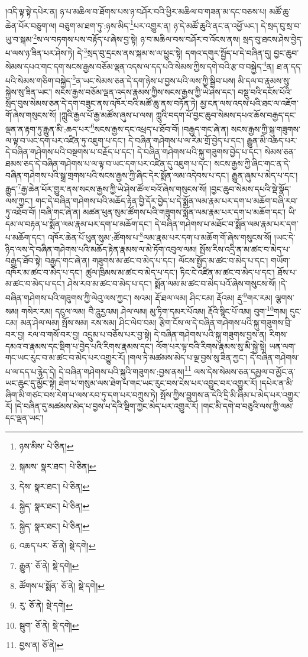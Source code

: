 །འདི་ལྟ་སྟེ་དཔེར་ན། ཉ་པ་མཆིལ་བ་ཐོགས་པས་ཉ་བཤོར་བའི་ཕྱིར་མཆིལ་བ་གཟན་མ་དང་བཅས་པ། མཚོ་ཆུ་ཆེན་པོར་བཅུག་ལ། བཅུག་མ་ཐག་ཏུ་:ཉས་མིད་\footnote{ཉས་མིས་  པེ་ཅིན། }པར་འགྱུར་ན། ཉ་དེ་མཚོ་ཆུའི་ནང་ན་འཕྱོ་ཡང་། དེ་སྲད་བུ་སྲ་བ་ཡུ་བ་སྐམ་\footnote{སྐམས་  སྣར་ཐང་།  པེ་ཅིན། }ས་ལ་བཏགས་པས་བརྟོད་པ་ཞེས་བྱ་སྟེ། ཉ་བ་མཆིལ་བས་བཤོར་བ་འོངས་ནས། སྲད་བུ་ཐངས་ཤེས་བྱེད་པ་ལས་ཉ་ཟིན་པར་ཤེས་ཏེ། དེ་\footnote{དེས་  སྣར་ཐང་།  པེ་ཅིན། }སྲད་བུ་དྲངས་ནས་སྐམ་ས་ལ་ཕྱུང་སྟེ། དགའ་དགུར་སྤྱོད་པ་དེ་བཞིན་དུ། བྱང་ཆུབ་སེམས་དཔའ་གང་དག་སངས་རྒྱས་བཅོམ་ལྡན་འདས་ལ་དད་པའི་སེམས་ཀྱིས་དགེ་བའི་རྩ་བ་བསྐྱེད་\footnote{སྐྱེད་  སྣར་ཐང་།  པེ་ཅིན། }ན། ཐ་ན་དད་པའི་སེམས་གཅིག་བསྐྱེད་\footnote{སྐྱེད་  སྣར་ཐང་།  པེ་ཅིན། }ན་ཡང་སེམས་ཅན་དེ་དག་ཉེས་པ་བྱས་པའི་ལས་ཀྱི་སྒྲིབ་པས། མི་དལ་བ་རྣམས་སུ་སྐྱེས་སུ་ཟིན་ཡང་། སངས་རྒྱས་བཅོམ་ལྡན་འདས་རྣམས་ཀྱིས་སངས་རྒྱས་ཀྱི་ཡེ་ཤེས་དང་། བསྡུ་བའི་དངོས་པོའི་སྲད་བུས་སེམས་ཅན་དེ་དག་བཟུང་ནས་འཁོར་བའི་མཚོ་ཆུ་ནས་བཏོན་ཏེ། མྱ་ངན་ལས་འདས་པའི་ཐང་ལ་འཇོག་གོ་ཞེས་གསུངས་སོ། །ཀླུའི་རྒྱལ་པོ་རྒྱ་མཚོས་ཞུས་པ་ལས། ཀླུའི་བདག་པོ་བྱང་ཆུབ་སེམས་དཔའ་ཆོས་བརྒྱད་དང་ལྡན་ན་རྟག་ཏུ་རྒྱུན་མི་:ཆད་པར་\footnote{འཆད་པར་  ཅོ་ནེ།  སྡེ་དགེ། }སངས་རྒྱས་དང་འཕྲད་པ་ཐོབ་བོ། །བརྒྱད་གང་ཞེ་ན། སངས་རྒྱས་ཀྱི་སྐུ་གཟུགས་ལ་ལྟ་བ་ཡང་དག་པར་འཛིན་ཏུ་འཇུག་པ་དང་། དེ་བཞིན་གཤེགས་པ་ལ་རིམ་གྲོ་བྱེད་པ་དང་། རྒྱུན་མི་འཆད་པར་དེ་བཞིན་གཤེགས་པའི་བསྔགས་པ་བརྗོད་པ་དང་། དེ་བཞིན་གཤེགས་པའི་སྐུ་གཟུགས་བྱེད་པ་དང་། སེམས་ཅན་ཐམས་ཅད་དེ་བཞིན་གཤེགས་པ་ལ་ལྟ་བ་ཡང་དག་པར་འཛིན་དུ་འཇུག་པ་དང་། སངས་རྒྱས་ཀྱི་ཞིང་གང་ན་དེ་བཞིན་གཤེགས་པའི་སྒྲ་གྲགས་པའི་སངས་རྒྱས་ཀྱི་ཞིང་དེར་སྨོན་ལམ་འདེབས་པ་དང་། རྒྱུན་ཞུམ་པ་མེད་པ་དང་། རྒྱུད་\footnote{རྒྱུན་  ཅོ་ནེ།  སྡེ་དགེ། }རྒྱ་ཆེན་པོར་གྱུར་ནས་སངས་རྒྱས་ཀྱི་ཡེ་ཤེས་ཚོལ་བའོ་ཞེས་གསུངས་སོ། །བྱང་ཆུབ་སེམས་དཔའི་སྡེ་སྣོད་ལས་ཀྱང་། གང་དེ་བཞིན་གཤེགས་པའི་མཆོད་རྟེན་བྱི་དོར་བྱེད་པ་དེ་སྨོན་ལམ་རྣམ་པར་དག་པ་མཆོག་བཞི་རབ་ཏུ་འཐོབ་བོ། །བཞི་གང་ཞེ་ན། མཚན་ཕུན་སུམ་ཚོགས་པའི་གཟུགས་སྨོན་ལམ་རྣམ་པར་དག་པ་མཆོག་དང་། ཡི་དམ་ལ་བརྟན་པ་སྨོན་ལམ་རྣམ་པར་དག་པ་མཆོག་དང་། དེ་བཞིན་གཤེགས་པ་མཐོང་བ་སྨོན་ལམ་རྣམ་པར་དག་པ་མཆོག་དང་། འཁོར་ཆེན་པོ་ཕུན་སུམ་:ཚོགས་པ་\footnote{ཚོགས་པ་སྨོན་  ཅོ་ནེ།  སྡེ་དགེ། }ལམ་རྣམ་པར་དག་པ་མཆོག་གོ་ཞེས་གསུངས་སོ། །ཡང་དེ་ཉིད་ལས་དེ་བཞིན་གཤེགས་པའི་མཆོད་རྟེན་རྣམས་ལ་མེ་ཏོག་འབུལ་ལམ། སྤོས་རིས་འདྲི་ན་མ་ཚང་བ་མེད་པ་བརྒྱད་ཐོབ་སྟེ། བརྒྱད་གང་ཞེ་ན། གཟུགས་མ་ཚང་བ་མེད་པ་དང་། ལོངས་སྤྱོད་མ་ཚང་བ་མེད་པ་དང་། གཡོག་འཁོར་མ་ཚང་བ་མེད་པ་དང་། ཚུལ་ཁྲིམས་མ་ཚང་བ་མེད་པ་དང་། ཏིང་ངེ་འཛིན་མ་ཚང་བ་མེད་པ་དང་། ཐོས་པ་མ་ཚང་བ་མེད་པ་དང་། ཤེས་རབ་མ་ཚང་བ་མེད་པ་དང་། སྨོན་ལམ་མ་ཚང་བ་མེད་པའོ་ཞེས་གསུངས་སོ། །དེ་བཞིན་གཤེགས་པའི་གཟུགས་ཀྱི་ལེའུ་ལས་ཀྱང་། སའམ། རྡོ་ཐལ་ལམ། ཤིང་ངམ། རྡོའམ། རྡུ་\footnote{རུ་  ཅོ་ནེ།  སྡེ་དགེ། }གར་རམ། ལྕགས་སམ། གསེར་རམ། དངུལ་ལམ། བཻ་ཌཱུརྱའམ། ཤེལ་ལམ། མུ་ཏིག་དམར་པོའམ། རྡོའི་སྙིང་པོ་འམ། བུག་\footnote{སྦུག་  ཅོ་ནེ།  སྡེ་དགེ། }གམ། དུང་ངམ། མན་ཤེལ་ལམ། སྤོས་སམ། རས་སམ། ཤིང་ལེབ་བམ། རྩིག་ངོས་ལ་དེ་བཞིན་གཤེགས་པའི་སྐུ་གཟུགས་བྲི་བར་བྱ། རལ་བ་གསོ་བར་བྱ། འདྲུམ་པ་བཅོས་པར་བྱ་སྟེ། དེ་བཞིན་གཤེགས་པའི་སྐུ་གཟུགས་བྱས་ན། རིགས་དམའ་བ་རྣམས་དང་སྡིག་པ་བྱེད་པའི་རིགས་རྣམས་དང་། ལོག་པར་ལྟ་བའི་རིགས་རྣམས་སུ་མི་སྐྱེ་སྟེ། ཡན་ལག་གང་ཡང་རུང་བ་མ་ཚང་བ་མེད་པར་འགྱུར་རོ། །གལ་ཏེ་མཚམས་མེད་པ་ལྔ་བྱས་སུ་ཟིན་ཀྱང་། དེ་བཞིན་གཤེགས་པ་ལ་དད་པ་རྙེད་དེ། དེ་བཞིན་གཤེགས་པའི་སྐུའི་གཟུགས་:བྱས་ནས།\footnote{བྱས་ན།  ཅོ་ནེ། } ལས་དེས་སེམས་ཅན་དམྱལ་བ་མྱོང་ན་ཡང་ཆུང་དུ་མྱོང་སྟེ། ཐེག་པ་གསུམ་ལས་ཐེག་པ་གང་ཡང་རུང་བས་ངེས་པར་འབྱུང་བར་འགྱུར་རོ། །དཔེར་ན་མི་ཞིག་མི་གཙང་བས་རེག་པ་ལས་རབ་ཏུ་དག་པར་བཀྲུས་ཏེ། སྤོས་ཀྱིས་བྱུགས་ན་དེའི་དྲི་མི་ཞིམ་པ་མེད་པར་འགྱུར་རོ། །དེ་བཞིན་དུ་མཚམས་མེད་པ་བྱས་པ་དེའི་སྡིག་ཀྱང་མེད་པར་འགྱུར་རོ། །གང་མི་དགེ་བ་བཅུའི་ལས་ཀྱི་ལམ་དང་ལྡན་ཡང་། 